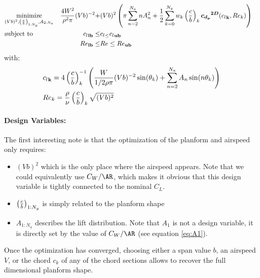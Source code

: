 \documentclass[letterpaper,12pt]{article}
\begin{document}
\begin{align*}
	& \underset{(Vb)^2, \left( \frac c b \right)_{1:N_y}, A_{2:N_a}}{\text{minimize}}  &
	\frac{4W^2}{\rho^2 \pi} (Vb)^{-2} + &
	(Vb)^2\left( 
	\pi \sum_{n=2}^{N_a} n A_n^2 +  
	\frac {1} {2} \sum_{k=0}^{N_y} w_k \left( \frac c b \right)_{k} \boldsymbol{{c_{d_p}}^{2D}}({c_l}_{\bf k}, Re_k) \right) & \\
	& \text{subject to} & {c_l}_{\bf lb} \leq &{c_l}_{\bf \leq} {c_l}_{\bf ub} \\
	& & {Re}_{\bf lb} \leq &{Re} \leq {Re}_{\bf ub}
\end{align*}
with:
\begin{align*}
	& {c_l}_{\bf k} = 4 \left( \frac c b \right)_{k}^{-1} \left(\frac{W}{1/2 \rho \pi} (Vb)^{-2} \sin(\theta_k) + \sum_{n=2}^{N_a} A_n \sin(n \theta_k) \right) \\
	& Re_{k} = \frac{\rho}{\nu}\left( \frac c b \right)_{k}\sqrt{(Vb)^2} 
\end{align*}



\paragraph{Design Variables:} The first interesting note is that the optimization of the planform and airspeed only requires:
\begin{itemize}
	\item $(Vb)^2$ which is the only place where the airspeed appears. Note that we could equivalently use $C_W / \AR$, which makes it obvious that this design variable is tightly connected to the nominal $C_L$.
	\item $\left( \frac c b \right)_{1:N_y}$ is simply related to the planform shape
	\item $A_{1:N_a}$ describes the lift distribution. Note that $A_1$ is not a design variable, it is directly set by the value of $C_W / \AR$ (see equation \ref{eq:A1}).
\end{itemize}
Once the optimization has converged, choosing either a span value $b$, an airspeed $V$, or the chord $c_k$ of any of the chord sections allows to recover the full dimensional planform shape.
\end{document}
